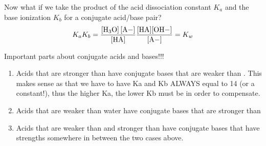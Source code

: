 \documentclass{article}  %
\begin{document}
Now what if we take the product of the acid dissociation constant $K_a$ and the base ionization $K_b$ for a conjugate acid/base pair?
\begin{equation*}
    \begin{aligned}
        K_a K_b = \ce{\frac{[H3O] [A-]}{[HA]}} \ce{\frac{[HA][OH-]}{[A-]}} = K_w
    \end{aligned}
\end{equation*}

Important parts about conjugate acids and bases!!!
\begin{enumerate}
    \item Acids that are stronger than  have conjugate bases that are weaker than . This makes sense as that we have to have Ka and Kb ALWAYS equal to 14 (or a constant!), thus the higher Ka, the lower Kb must be in order to compensate.
    \item Acids that are weaker than water have conjugate bases that are stronger than 
    \item Acids that are weaker than  and stronger than  have conjugate bases that have strengths somewhere in between the two cases above.
\end{enumerate}
\end{document}
